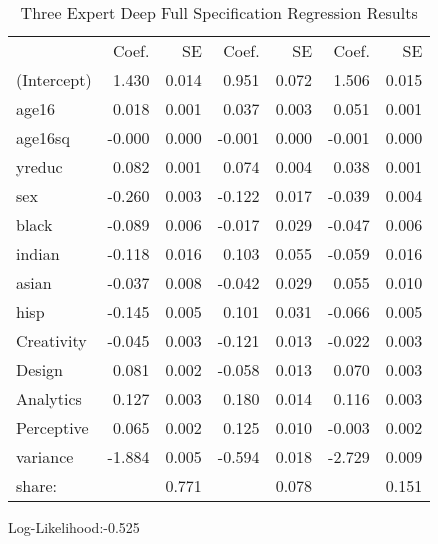 \documentclass[12pt]{article}
\begin{document}
\begin{table} \centering
  \caption{Three Expert Deep Full Specification Regression Results}
    \begin{threeparttable}
      \begin{tabular}[l]{l r r r r r r}
\cmidrule{1-7}                                                                           
                &  Coef.   &   SE   &   Coef.  & SE   &   Coef.  &  SE    \\
\cmidrule(l){2-3}  \cmidrule(l){4-5}  \cmidrule(l){6-7}
(Intercept)     &  1.430   &  0.014   &  0.951  &  0.072   &   1.506  &  0.015    \\
age16           &  0.018   &  0.001   &  0.037  &  0.003   &   0.051  &  0.001    \\
age16sq         & -0.000   &  0.000   & -0.001  &  0.000   &  -0.001  &  0.000    \\
yreduc          &  0.082   &  0.001   &  0.074  &  0.004   &   0.038  &  0.001    \\
sex             & -0.260   &  0.003   & -0.122  &  0.017   &  -0.039  &  0.004    \\
black           & -0.089   &  0.006   & -0.017  &  0.029   &  -0.047  &  0.006    \\
indian          & -0.118   &  0.016   &  0.103  &  0.055   &  -0.059  &  0.016    \\
asian           & -0.037   &  0.008   & -0.042  &  0.029   &   0.055  &  0.010    \\
hisp            & -0.145   &  0.005   &  0.101  &  0.031   &  -0.066  &  0.005    \\
Creativity      & -0.045   &  0.003   & -0.121  &  0.013   &  -0.022  &  0.003    \\
Design          &  0.081   &  0.002   & -0.058  &  0.013   &   0.070  &  0.003    \\
Analytics       &  0.127   &  0.003   &  0.180  &  0.014   &   0.116  &  0.003    \\
Perceptive      &  0.065   &  0.002   &  0.125  &  0.010   &  -0.003  &  0.002    \\
variance        & -1.884   &  0.005   & -0.594  &  0.018   &  -2.729  &  0.009    \\
\cmidrule(l){2-3}  \cmidrule(l){4-5}  \cmidrule(l){6-7}
share:          &             &     0.771   &             &   0.078   &             &   0.151     \\
\cmidrule{1-7} 
      \end{tabular}

      \begin{tablenotes}
        \item Log-Likelihood:-0.525

      \end{tablenotes} \label{tbl:3E_D_full_regressions_results}


    \end{threeparttable}

\end{table}
\end{document}
